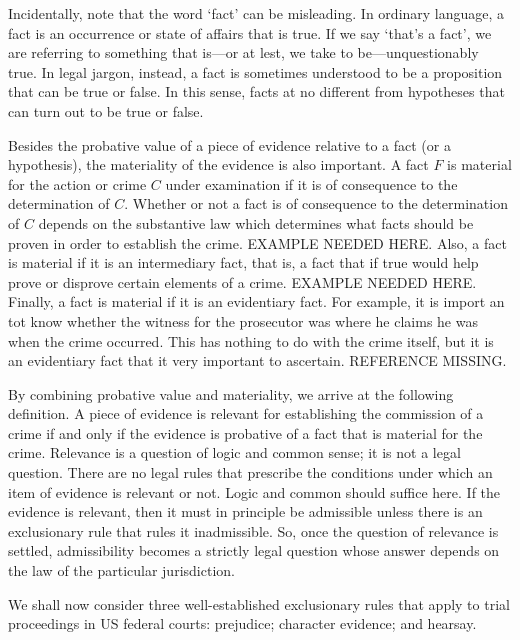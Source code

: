 \documentclass[10pt]{article}
\begin{document}
Incidentally, note that the word `fact' can be misleading. In ordinary language, a fact is an occurrence or state of affairs that is true. If we say `that's a fact', we are referring to 
something that is---or at lest, we take to be---unquestionably true. In legal jargon, instead, a fact is sometimes understood to be a proposition 
that can be true or false. In this sense, facts at no different from hypotheses that can turn out to be true or false.


Besides the probative value of a piece of evidence relative to a fact (or a hypothesis), the materiality of the evidence 
is also important. A fact $F$ is material for the action or crime $C$ under examination if it is of consequence to the determination of $C$. Whether or not a fact is of consequence to the determination of $C$ depends on the substantive law which determines what facts should be proven in order to establish the crime. EXAMPLE NEEDED HERE. Also, a fact is material if it is an intermediary fact, that is, a fact that if true would help prove or disprove certain elements of a crime. EXAMPLE NEEDED HERE. Finally, a fact is material if it is an evidentiary fact. For example, it is import an tot know whether the witness for the prosecutor was where he claims he was when the crime occurred. This has nothing to do with the crime itself, but it is an evidentiary fact that it very important to ascertain.  
REFERENCE MISSING. 

By combining probative value and materiality, we arrive at the following definition. A piece of evidence is relevant for establishing the commission of a 
crime if and only if the evidence is probative of a fact that is material for the crime. Relevance is a question of logic and common sense; it is not a legal question. 
There are no legal rules that prescribe the conditions under which an item of evidence is relevant or not. Logic and common should suffice here.
If the evidence is relevant, then it must in principle be admissible unless there is an exclusionary rule that rules it inadmissible. 
So, once the question of relevance is settled, admissibility becomes a strictly legal question whose answer depends 
on the law of the particular jurisdiction. 

We shall now consider three well-established exclusionary rules 
that apply to trial proceedings in US federal courts: 
prejudice; character evidence; and hearsay. 
\end{document}
